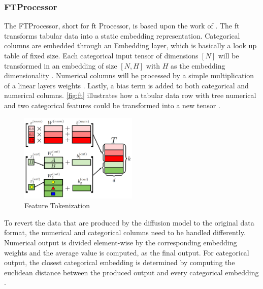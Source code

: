 \subsubsection*{FTProcessor}
\label{ch:FTProcessor}

The FTProcessor, short for \gls{ft} Processor, is based upon the work of \cite{zheng2022DiffusionModelsMissing, gorishniy2021RevisitingDeepLearning}.
The \gls{ft} transforms tabular data into a static embedding representation.
Categorical columns are embedded through an Embedding layer, which is basically a look up table \cite{EmbeddingPyTorch13} of fixed size.
Each categorical input tensor of dimensions $[N]$ will be transformed in an embedding of size $[N,H]$ with $H$ as the embedding dimensionality \cite{gorishniy2021RevisitingDeepLearning}.
Numerical columns will be processed by a simple multiplication of a linear layers weights \cite{gorishniy2021RevisitingDeepLearning}.
Lastly, a bias term is added to both categorical and numerical columns.
\autoref{fig:ft} illustrates how a tabular data row with tree numerical and two categorical features could be transformed into a new tensor \cite[Figure 2a, p.4]{gorishniy2021RevisitingDeepLearning}.

\begin{figure}[h]
	\centering
	\includegraphics[width=0.5\textwidth]{images/ft.png}
	\caption{Feature Tokenization \cite[Figure 2a, p.4]{gorishniy2021RevisitingDeepLearning}}
	\label{fig:ft}
\end{figure}

To revert the data that are produced by the diffusion model to the original data format, the numerical and categorical columns need to be handled differently.
Numerical output is divided element-wise by the corresponding embedding weights and the average value is computed, as the final output\cite{zheng2022DiffusionModelsMissing}.
For categorical output, the closest categorical embedding is determined by computing the euclidean distance between the produced output and every categorical embedding \cite{zheng2022DiffusionModelsMissing}.

